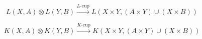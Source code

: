 $$L(X, A) \otimes L(Y, B) \xrightarrow{L\text{-cup}} L(X \times Y, (A \times Y) \cup (X \times B))$$

$$K(X, A) \otimes K(Y, B) \xrightarrow{K\text{-cup}} K(X \times Y, (A \times Y) \cup (X \times B))$$
